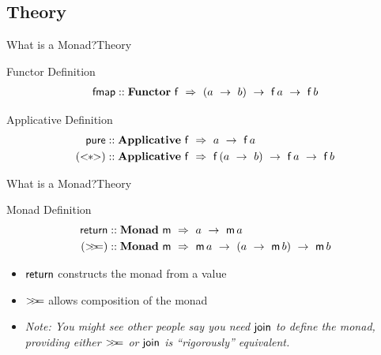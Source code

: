 \documentclass{beamer}
\begin{document}
  \subsection{Theory}
  \begin{frame}{What is a Monad?}{Theory}
    \begin{block}{Functor Definition}
      \begin{align*}
        \fmap &:: \mathbf{Functor}\ \mathsf{f}\ \Rightarrow\ (a\ \rightarrow\ b)\ \rightarrow\ \F{a}\ \rightarrow\ \F{b}\\
      \end{align*}
    \end{block}
    \begin{block}{Applicative Definition}
      \begin{align*}
        \pure &:: \mathbf{Applicative}\ \mathsf{f}\ \Rightarrow\ a\ \rightarrow\ \A{a}\\
        (\app) &:: \mathbf{Applicative}\ \mathsf{f}\ \Rightarrow\ \A{(a\ \rightarrow\ b)}\ \rightarrow\ \A{a}\ \rightarrow\ \A{b}\\
      \end{align*}
    \end{block}
  \end{frame}
  \begin{frame}{What is a Monad?}{Theory}
    \begin{block}{Monad Definition}
      \begin{align*}
        \return &:: \mathbf{Monad}\ \mathsf{m}\ \Rightarrow\ a\ \rightarrow\ \M{a}\\
        (\bind) &:: \mathbf{Monad}\ \mathsf{m}\ \Rightarrow\ \M{a}\ \rightarrow\ (a\ \rightarrow\ \M{b})\ \rightarrow\ \M{b}\\
      \end{align*}
    \end{block}
    \begin{itemize}
      \item $\mathsf{return}$ constructs the monad from a value\\
      \item $\mathsf{>\!\!>\!\!=}$ allows composition of the monad\\
      \item \textit{Note: You might see other people say you need $\mathsf{join}$ to define the monad,
        providing either $\mathsf{>\!\!>\!\!=}$ or $\mathsf{join}$ is ``rigorously'' equivalent.}
    \end{itemize}
  \end{frame}
\end{document}

